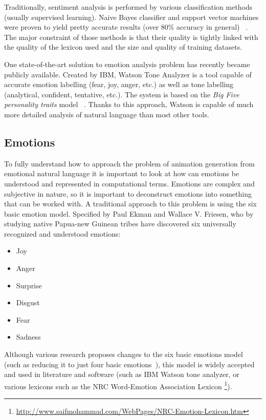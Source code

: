 Traditionally, sentiment analysis is performed by various classification methods (usually supervised learning). Naive Bayes classifier and support vector machines were proven to yield pretty accurate results (over 80\% accuracy in general) ~\cite{sentimentanal1}. The major constraint of those methods is that their quality is tightly linked with the quality of the lexicon used and the size and quality of training datasets.

One state-of-the-art solution to emotion analysis problem has recently became publicly available. Created by IBM, Watson Tone Analyzer is a tool capable of accurate emotion labelling (fear, joy, anger, etc.) as well as tone labelling (analytical, confident, tentative, etc.). The system is based on the \textit{Big Five personality traits} model ~\cite{watson}. Thanks to this approach, Watson is capable of much more detailed analysis of natural language than most other tools.


\subsection{Emotions}
To fully understand how to approach the problem of animation generation from emotional natural language it is important to look at how can emotions be understood and represented in computational terms. Emotions are complex and subjective in nature, so it is important to deconstruct emotions into something that can be worked with. A traditional approach to this problem is using the six basic emotion model. Specified by Paul Ekman and Wallace V. Friesen, who by studying native Papua-new Guinean tribes have discovered six universally recognized and understood emotions: ~\cite{basicemo}
\begin{itemize}
\item Joy
\item Anger
\item Surprise
\item Disgust
\item Fear
\item Sadness
\end{itemize}

Although various research proposes changes to the six basic emotions model (such as reducing it to just four basic emotions~\cite{fouremo}), this model is widely accepted and used in literature and software (such as IBM Watson tone analyzer, or various lexicons such as the NRC Word-Emotion Association Lexicon \footnote{\url{http://www.saifmohammad.com/WebPages/NRC-Emotion-Lexicon.htm}}).


